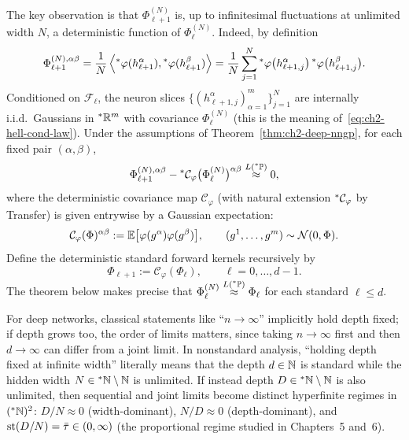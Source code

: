 The key observation is that $\Phi_{\ell+1}^{(N)}$ is, up to infinitesimal fluctuations at unlimited width $N$, a deterministic function of $\Phi_\ell^{(N)}$. Indeed, by definition
\begin{equation}\label{eq:ch2-phi-ell1-sum}
\Phi_{\ell+1}^{(N),\alpha\beta}
= \frac{1}{N} \left\langle {}^*\varphi(h_{\ell+1}^\alpha), {}^*\varphi(h_{\ell+1}^\beta) \right\rangle
= \frac{1}{N} \sum_{j=1}^{N} {}^*\varphi\bigl(h_{\ell+1,j}^\alpha\bigr) \, {}^*\varphi\bigl(h_{\ell+1,j}^\beta\bigr).
\end{equation}
Conditioned on $\mathcal{F}_\ell$, the neuron slices $\{(h_{\ell+1,j}^\alpha)_{\alpha=1}^{m}\}_{j=1}^{N}$ are internally i.i.d.\ Gaussians in ${}^*\mathbb{R}^m$ with covariance $\Phi_\ell^{(N)}$ (this is the meaning of~\eqref{eq:ch2-hell-cond-law}). Under the assumptions of Theorem~\ref{thm:ch2-deep-nngp}, for each fixed pair $(\alpha, \beta)$,
\begin{equation}\label{eq:ch2-phi-cond-conc}
\Phi_{\ell+1}^{(N),\alpha\beta} - {}^*\mathcal{C}_\varphi\bigl(\Phi_\ell^{(N)}\bigr)^{\alpha\beta} \stackrel{L({}^*\mathbb{P})}{\approx} 0,
\end{equation}
where the deterministic covariance map $\mathcal{C}_\varphi$ (with natural extension ${}^*\mathcal{C}_\varphi$ by Transfer) is given entrywise by a Gaussian expectation:
\begin{equation}\label{eq:ch2-cphi-def}
\mathcal{C}_\varphi(\Phi)^{\alpha\beta} := \mathbb{E}\bigl[\varphi(g^\alpha)\varphi(g^\beta)\bigr], \qquad (g^1, \dots, g^m) \sim \mathcal{N}(0, \Phi).
\end{equation}
Define the deterministic standard forward kernels recursively by
\begin{equation}\label{eq:ch2-phi-rec}
\Phi_{\ell+1} := \mathcal{C}_\varphi(\Phi_\ell), \qquad \ell = 0, \dots, d-1.
\end{equation}
The theorem below makes precise that $\Phi_\ell^{(N)} \stackrel{L({}^*\mathbb{P})}{\approx} \Phi_\ell$ for each standard $\ell \le d$.

\begin{remark}\label{rem:ch2-order-limits}
For deep networks, classical statements like ``$n \to \infty$'' implicitly hold depth fixed; if depth grows too, the order of limits matters, since taking $n \to \infty$ first and then $d \to \infty$ can differ from a joint limit. In nonstandard analysis, ``holding depth fixed at infinite width'' literally means that the depth $d \in \mathbb{N}$ is standard while the hidden width $N \in {}^*\mathbb{N} \setminus \mathbb{N}$ is unlimited. If instead depth $D \in {}^*\mathbb{N} \setminus \mathbb{N}$ is also unlimited, then sequential and joint limits become distinct hyperfinite regimes in $({}^*\mathbb{N})^2$: $D/N \approx 0$ (width-dominant), $N/D \approx 0$ (depth-dominant), and $\operatorname{st}(D/N) = \bar{\tau} \in (0, \infty)$ (the proportional regime studied in Chapters~5 and~6).
\end{remark}

